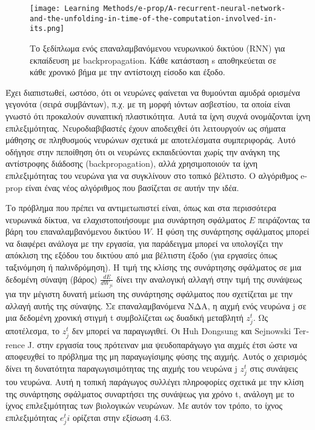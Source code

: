 \documentclass[12pt]{report}
\begin{document}
\begin{figure}[htp]
    \centering
    \texttt{[image: Learning Methods/e-prop/A-recurrent-neural-network-and-the-unfolding-in-time-of-the-computation-involved-in-its.png]}
    \caption{Το ξεδίπλωμα ενός επαναλαμβανόμενου νευρωνικού δικτύου \textlatin{(RNN)} για εκπαίδευση με \textlatin{backpropagation}. Κάθε κατάσταση \textlatin{s} αποθηκεύεται σε κάθε χρονικό βήμα με την αντίστοιχη είσοδο και έξοδο.
    \label{fig:readout}}
\end{figure}

Έχει διαπιστωθεί, ωστόσο, ότι οι νευρώνες φαίνεται να θυμούνται αμυδρά ορισμένα γεγονότα (σειρά συμβάντων), π.χ. με τη μορφή ιόντων ασβεστίου, τα οποία είναι γνωστό ότι προκαλούν συναπτική πλαστικότητα. Aυτά τα ίχνη συχνά ονομάζονται ίχνη επιλεξιμότητας. Νευροδιαβιβαστές έχουν αποδειχθεί ότι λειτουργούν ως σήματα μάθησης σε πληθυσμούς νευρώνων σχετικά με αποτελέσματα συμπεριφοράς. Αυτό οδήγησε στην πεποίθηση ότι οι νευρώνες εκπαιδεύονται χωρίς την ανάγκη της αντίστροφης διάδοσης (\textlatin{backpropagation}), αλλά χρησιμοποιούν τα ίχνη επιλεξιμότητας του νευρώνα για να συγκλίνουν στο τοπικό βέλτιστο. Ο αλγόριθμος \textlatin{e-prop} είναι ένας νέος αλγόριθμος που βασίζεται σε αυτήν την ιδέα.

Το πρόβλημα που πρέπει να αντιμετωπιστεί είναι, όπως και στα περισσότερα νευρωνικά δίκτυα, να ελαχιστοποιήσουμε μια συνάρτηση σφάλματος \(E\) πειράζοντας τα βάρη του επαναλαμβανόμενου δικτύου \(W\). Η φύση της συνάρτησης σφάλματος μπορεί να διαφέρει ανάλογα με την εργασία, για παράδειγμα μπορεί να υπολογίζει την απόκλιση της εξόδου του δικτύου από μια βέλτιστη έξοδο (για εργασίες όπως ταξινόμηση ή παλινδρόμηση). Η τιμή της κλίσης της συνάρτησης σφάλματος σε μια δεδομένη σύναψη (βάρος) \(\frac{dE}{dW_{ji}}\) δίνει την αναλογική αλλαγή στην τιμή της συνάψεως για την μέγιστη δυνατή μείωση της συνάρτησης σφάλματος που σχετίζεται με την αλλαγή αυτής της σύναψης. Σε επαναλαμβανόμενα ΝΔΑ, η αιχμή ενός νευρώνα \textlatin{j} σε μια δεδομένη χρονική στιγμή \textlatin{t} συμβολίζεται ως δυαδική μεταβλητή \(z^t_j\). Ως αποτέλεσμα, το \(z^t_j\) δεν μπορεί να παραγωγιθεί. Οι \textlatin{Huh Dongsung} και \textlatin{Sejnowski Terrence J.} στην εργασία τους \cite{Huh2018} πρότειναν μια ψευδοπαράγωγο για αιχμές έτσι ώστε να αποφευχθεί το πρόβλημα της μη παραγωγίσιμης φύσης της αιχμής. Αυτός ο χειρισμός δίνει τη δυνατότητα παραγωγισιμότητας της αιχμής του νευρώνα \textlatin{j} \(z^t_j\) στις συνάψεις του νευρώνα. Αυτή η τοπική παράγωγος συλλέγει πληροφορίες σχετικά με την κλίση της συνάρτησης σφάλματος συναρτήσει της συνάψεως για χρόνο \textlatin{t}, ανάλογη με το ίχνος επιλεξιμότητας των βιολογικών νευρώνων. Με αυτόν τον τρόπο, το ίχνος επιλεξιμότητας \(e^t_ji\) ορίζεται στην εξίσωση 4.63.
\end{document}
